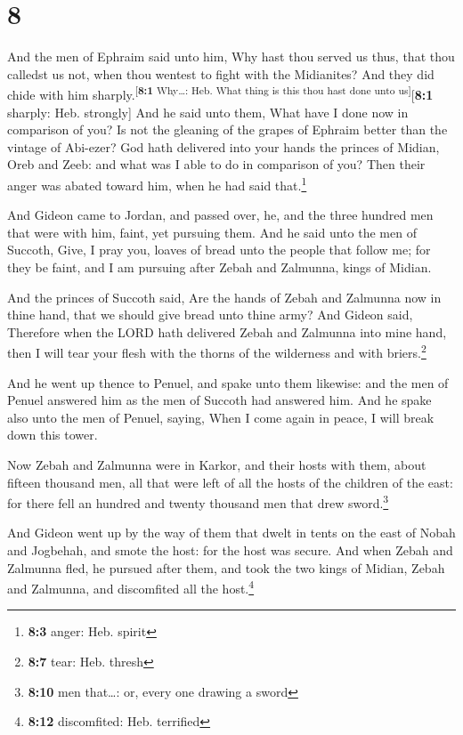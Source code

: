 \hypertarget{section-7}{%
\section{8}\label{section-7}}

 And the men of Ephraim said unto him, Why hast thou
served us thus, that thou calledst us not, when thou wentest to fight
with the Midianites? And they did chide with him
sharply.\textsuperscript{{[}\textbf{8:1} Why\ldots: Heb. What thing is
this thou hast done unto us{]}}{[}\textbf{8:1} sharply: Heb. strongly{]}
 And he said unto them, What have I done now in comparison
of you? Is not the gleaning of the grapes of Ephraim better than the
vintage of Abi-ezer?  God hath delivered into your hands
the princes of Midian, Oreb and Zeeb: and what was I able to do in
comparison of you? Then their anger was abated toward him, when he had
said that.\footnote{\textbf{8:3} anger: Heb. spirit}

 And Gideon came to Jordan, and passed over, he, and the
three hundred men that were with him, faint, yet pursuing them.
 And he said unto the men of Succoth, Give, I pray you,
loaves of bread unto the people that follow me; for they be faint, and I
am pursuing after Zebah and Zalmunna, kings of Midian.

 And the princes of Succoth said, Are the hands of Zebah
and Zalmunna now in thine hand, that we should give bread unto thine
army?  And Gideon said, Therefore when the LORD hath
delivered Zebah and Zalmunna into mine hand, then I will tear your flesh
with the thorns of the wilderness and with briers.\footnote{\textbf{8:7}
  tear: Heb. thresh}

 And he went up thence to Penuel, and spake unto them
likewise: and the men of Penuel answered him as the men of Succoth had
answered him.  And he spake also unto the men of Penuel,
saying, When I come again in peace, I will break down this tower.

 Now Zebah and Zalmunna were in Karkor, and their hosts
with them, about fifteen thousand men, all that were left of all the
hosts of the children of the east: for there fell an hundred and twenty
thousand men that drew sword.\footnote{\textbf{8:10} men that\ldots: or,
  every one drawing a sword}

 And Gideon went up by the way of them that dwelt in
tents on the east of Nobah and Jogbehah, and smote the host: for the
host was secure.  And when Zebah and Zalmunna fled, he
pursued after them, and took the two kings of Midian, Zebah and
Zalmunna, and discomfited all the host.\footnote{\textbf{8:12}
  discomfited: Heb. terrified}

